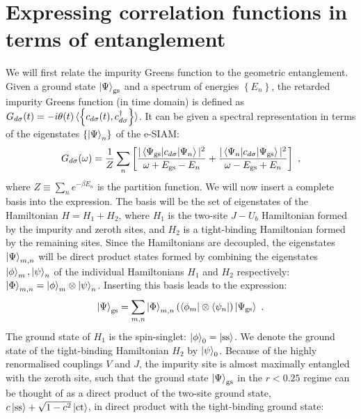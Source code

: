 \documentclass{iopart}
\begin{document}
\section{Expressing correlation functions in terms of entanglement}
\label{general-ent}

We will first relate the impurity Greens function to the geometric entanglement. Given a ground state \(\ket{\Psi}_\text{gs}\) and a spectrum of energies \(\left\{ E_n \right\} \), the retarded impurity Greens function (in time domain) is defined as \(G_{d\sigma}(t) = -i\theta(t)\braket{\left\{c_{d\sigma}(t),c^\dagger_{d\sigma}\right\}}\). It can be given a spectral representation in terms of the eigenstates \(\left\{\ket{\Psi}_n\right\}\) of the e-SIAM:
\begin{eqnarray}
	\label{green_spectral}
	G_{d\sigma}(\omega) = \frac{1}{Z}\sum_n \left[ \frac{|\braket{\Psi_\text{gs} | c_{d\sigma} | \Psi_n}|^2}{\omega + E_\text{gs} - E_n} + \frac{|\braket{\Psi_n | c_{d\sigma} | \Psi_\text{gs}}|^2}{\omega - E_\text{gs} + E_n}\right] ~,
\end{eqnarray}
where \(Z \equiv \sum_n e^{-\beta E_n}\) is the partition function.
We will now insert a complete basis into the expression. The basis will be the set of eigenstates of the Hamiltonian  \(H = H_1 + H_2\), where \(H_1\) is the two-site \(J-U_b\) Hamiltonian formed by the impurity and zeroth sites, and \(H_2\) is a tight-binding Hamiltonian formed by the remaining sites. Since the Hamiltonians are decoupled, the eigenstates \(\ket{\Psi}_{m,n}\) will be direct product states formed by combining the eigenstates \(\ket{\phi}_m,\ket{\psi}_n\) of the individual Hamiltonians \(H_1\) and \(H_2\) respectively: \(\ket{\Phi}_{m,n} = \ket{\phi}_m\otimes\ket{\psi}_n\). Inserting this basis leads to the expression:
\begin{eqnarray}
	\label{summation}
	\ket{\Psi}_\text{gs} = \sum_{m,n} \ket{\Phi}_{m,n} \left(\bra{\phi_{m}}\otimes\bra{\psi_n}\right)\ket{\Psi_\text{gs}}~.
\end{eqnarray}
The ground state of \(H_1\) is the spin-singlet: \(\ket{\phi}_0 = \ket{\text{ss}}\). We denote the ground state of the tight-binding Hamiltonian \(H_2\) by \(\ket{\psi}_0\). Because of the highly renormalised couplings \(V\) and \(J\), the impurity site is almost maximally entangled with the zeroth site, such that the ground state \(\ket{\Psi}_\text{gs}\) in the \(r < 0.25\) regime can be thought of as a direct product of the two-site ground state, \(c\ket{\text{ss}} + \sqrt{1-c^2}\ket{\text{ct}}\), in direct product with the tight-binding ground state:
\end{document}
